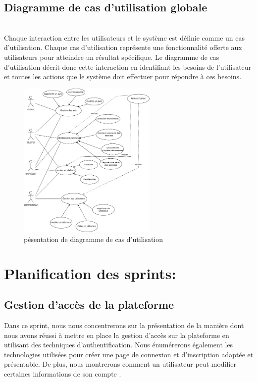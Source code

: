 \subsection{Diagramme de cas d'utilisation globale}
\\
Chaque interaction entre les utilisateurs et le système est définie comme un cas d'utilisation.
Chaque cas d'utilisation représente une fonctionnalité offerte aux utilisateurs pour atteindre un résultat spécifique. Le diagramme de cas d'utilisation décrit donc cette interaction en identifiant les besoins de l'utilisateur et toutes les actions que le système doit effectuer pour répondre à ces besoins.

  \begin{figure}[h]%
    \center%
    \includegraphics[width=0.6\textwidth]{pages/image/asma-usecase-global.jpg}
            \caption{pésentation de diagramme de cas d'utilisation}\label{fig:test}%
  \end{figure}

\section{Planification des sprints:}
 \subsection{\normal {}Gestion d'accès de la plateforme}
Dans ce sprint, nous nous concentrerons sur la présentation de la manière dont nous avons réussi à mettre en place la gestion d'accès sur la plateforme en utilisant des techniques d'authentification. Nous énumérerons également les technologies utilisées pour créer une page de connexion et d'inscription adaptée et présentable. De plus, nous montrerons comment un utilisateur peut modifier certaines informations de son compte .
 
